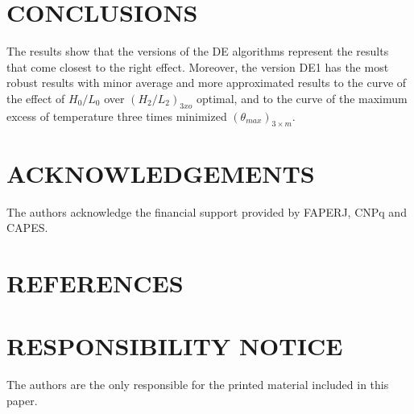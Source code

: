 \documentclass[10pt,fleqn,a4paper,twoside]{article}
\begin{document}
\section{CONCLUSIONS}

The results show that the versions of the DE algorithms represent the results that come closest to the right effect. Moreover, the version DE1 has the most robust results with minor average and more approximated results to the curve of the effect of $H_{0}/L_{0}$ over $(H_{2}/L_{2})_{3xo}$ optimal, and to the curve of the maximum excess of temperature three times minimized $({\theta}_{max})_{3\times m}$.


\section{ACKNOWLEDGEMENTS}

The authors acknowledge the financial support provided by FAPERJ, CNPq and CAPES.

\section{REFERENCES} 


\renewcommand{\refname}{}


\section{RESPONSIBILITY NOTICE}

The authors are the only responsible for the printed material included in this paper.
\end{document}
